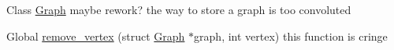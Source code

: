 
\begin{DoxyRefList}
\item[Class \mbox{\hyperlink{structGraph}{Graph}} ]\label{todo__todo000001}%
%
maybe rework? the way to store a graph is too convoluted  
\item[Global \mbox{\hyperlink{graphs_8h_a5be0e3005b2f6b61fd9b802ddbfe7305}{remove\+\_\+vertex}} (struct \mbox{\hyperlink{structGraph}{Graph}} $\ast$graph, int vertex)]\label{todo__todo000002}%
%
this function is cringe 
\end{DoxyRefList}